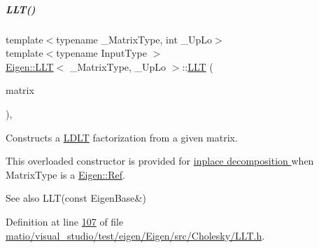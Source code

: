 \mbox{\label{group___cholesky___module_a1848a00addade9a0f7f70493c52ecc9d}} 
\subparagraph{\texorpdfstring{L\+L\+T()}{LLT()}\hspace{0.1cm}{\footnotesize\ttfamily [6/6]}}
{\footnotesize\ttfamily template$<$typename \+\_\+\+Matrix\+Type, int \+\_\+\+Up\+Lo$>$ \\
template$<$typename Input\+Type $>$ \\
\hyperlink{group___cholesky___module_class_eigen_1_1_l_l_t}{Eigen\+::\+L\+LT}$<$ \+\_\+\+Matrix\+Type, \+\_\+\+Up\+Lo $>$\+::\hyperlink{group___cholesky___module_class_eigen_1_1_l_l_t}{L\+LT} (\begin{DoxyParamCaption}\item[{\hyperlink{group___core___module_struct_eigen_1_1_eigen_base}{Eigen\+Base}$<$ Input\+Type $>$ \&}]{matrix }\end{DoxyParamCaption})\hspace{0.3cm}{\ttfamily [inline]}, {\ttfamily [explicit]}}



Constructs a \hyperlink{group___cholesky___module_class_eigen_1_1_l_d_l_t}{L\+D\+LT} factorization from a given matrix. 

This overloaded constructor is provided for \hyperlink{group___inplace_decomposition}{inplace decomposition } when {\ttfamily Matrix\+Type} is a \hyperlink{group___core___module_class_eigen_1_1_ref}{Eigen\+::\+Ref}.

\begin{DoxySeeAlso}{See also}
L\+L\+T(const Eigen\+Base\&) 
\end{DoxySeeAlso}


Definition at line \hyperlink{matio_2visual__studio_2test_2eigen_2_eigen_2src_2_cholesky_2_l_l_t_8h_source_l00107}{107} of file \hyperlink{matio_2visual__studio_2test_2eigen_2_eigen_2src_2_cholesky_2_l_l_t_8h_source}{matio/visual\+\_\+studio/test/eigen/\+Eigen/src/\+Cholesky/\+L\+L\+T.\+h}.



